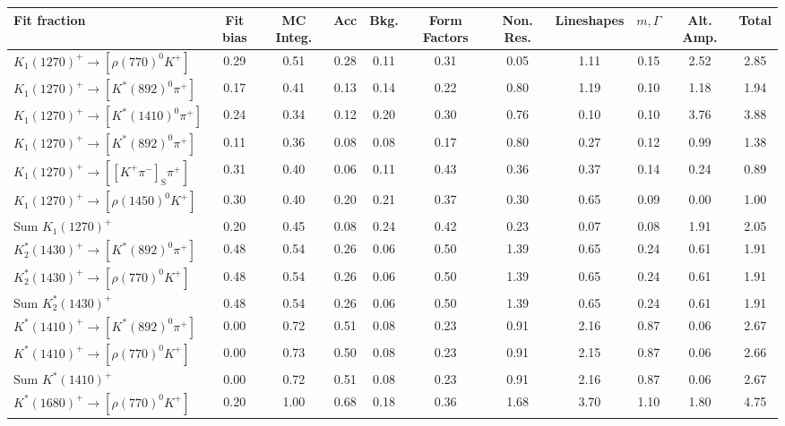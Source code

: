 \begin{tabular}{l  c  c  c  c  c  c  c  c  c  | c }
\hline
\hline
Fit fraction & Fit bias & MC Integ. & Acc & Bkg. & Form Factors & Non. Res. & Lineshapes & $m,\Gamma$ & Alt. Amp. &  Total  \\ 
\hline
$K_{1}(1270)^{+}\rightarrow \left[\rho(770)^{0}K^{+}\right]$ & 0.29 & 0.51 & 0.28 & 0.11 & 0.31 & 0.05 & 1.11 & 0.15 & 2.52 & 2.85 \\ 
$K_{1}(1270)^{+}\rightarrow \left[K^{*}(892)^{0}\pi^{+}\right]$ & 0.17 & 0.41 & 0.13 & 0.14 & 0.22 & 0.80 & 1.19 & 0.10 & 1.18 & 1.94 \\ 
$K_{1}(1270)^{+}\rightarrow \left[K^{*}(1410)^{0}\pi^{+}\right]$ & 0.24 & 0.34 & 0.12 & 0.20 & 0.30 & 0.76 & 0.10 & 0.10 & 3.76 & 3.88 \\ 
$K_{1}(1270)^{+}\rightarrow \left[K^{*}(892)^{0}\pi^{+}\right]$ & 0.11 & 0.36 & 0.08 & 0.08 & 0.17 & 0.80 & 0.27 & 0.12 & 0.99 & 1.38 \\ 
$K_{1}(1270)^{+}\rightarrow \left[\left[K^{+}\pi^{-}\right]_{\text{S}}\pi^{+}\right]$ & 0.31 & 0.40 & 0.06 & 0.11 & 0.43 & 0.36 & 0.37 & 0.14 & 0.24 & 0.89 \\ 
$K_{1}(1270)^{+}\rightarrow \left[\rho(1450)^{0}K^{+}\right]$ & 0.30 & 0.40 & 0.20 & 0.21 & 0.37 & 0.30 & 0.65 & 0.09 & 0.00 & 1.00 \\ 
$\text{Sum } K_{1}(1270)^{+}$ & 0.20 & 0.45 & 0.08 & 0.24 & 0.42 & 0.23 & 0.07 & 0.08 & 1.91 & 2.05 \\ 
$K_{2}^{*}(1430)^{+}\rightarrow \left[K^{*}(892)^{0}\pi^{+}\right]$ & 0.48 & 0.54 & 0.26 & 0.06 & 0.50 & 1.39 & 0.65 & 0.24 & 0.61 & 1.91 \\ 
$K_{2}^{*}(1430)^{+}\rightarrow \left[\rho(770)^{0}K^{+}\right]$ & 0.48 & 0.54 & 0.26 & 0.06 & 0.50 & 1.39 & 0.65 & 0.24 & 0.61 & 1.91 \\ 
$\text{Sum } K_{2}^{*}(1430)^{+}$ & 0.48 & 0.54 & 0.26 & 0.06 & 0.50 & 1.39 & 0.65 & 0.24 & 0.61 & 1.91 \\ 
$K^{*}(1410)^{+}\rightarrow \left[K^{*}(892)^{0}\pi^{+}\right]$ & 0.00 & 0.72 & 0.51 & 0.08 & 0.23 & 0.91 & 2.16 & 0.87 & 0.06 & 2.67 \\ 
$K^{*}(1410)^{+}\rightarrow \left[\rho(770)^{0}K^{+}\right]$ & 0.00 & 0.73 & 0.50 & 0.08 & 0.23 & 0.91 & 2.15 & 0.87 & 0.06 & 2.66 \\ 
$\text{Sum } K^{*}(1410)^{+}$ & 0.00 & 0.72 & 0.51 & 0.08 & 0.23 & 0.91 & 2.16 & 0.87 & 0.06 & 2.67 \\ 
$K^{*}(1680)^{+}\rightarrow \left[\rho(770)^{0}K^{+}\right]$ & 0.20 & 1.00 & 0.68 & 0.18 & 0.36 & 1.68 & 3.70 & 1.10 & 1.80 & 4.75 \\ 

\end{tabular}
